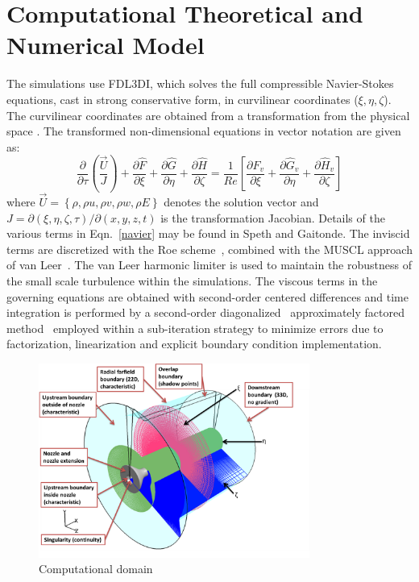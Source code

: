 \documentclass[english]{aiaa-tc}
\begin{document}
\section{Computational Theoretical and Numerical Model}\label{theo}
The simulations use FDL3DI, which solves the full compressible Navier-Stokes equations, cast in strong conservative form, in curvilinear coordinates ($\xi,\eta,\zeta$). The curvilinear coordinates are obtained from a transformation from the physical space \cite{vm74-1,sjl78-1}. The transformed non-dimensional equations in vector notation are given as:
\begin{equation}
\frac{\partial}{\partial\tau}\left(\frac{\vec{U}}{J}\right)+\frac{\partial\hat{F}}{\partial\xi}+\frac{\partial\hat{G}}{\partial\eta}+\frac{\partial\hat{H}}{\partial\zeta}=\frac{1}{Re}\left[\frac{\partial\hat{F}_{v}}{\partial\xi}+\frac{\partial\hat{G}_{v}}{\partial\eta}+\frac{\partial\hat{H}_{v}}{\partial\zeta}\right]\label{navier}
\end{equation}
where $\vec{U}=\left\{ \rho,\rho u,\rho v,\rho w,\rho E\right\} $
denotes the solution vector and
$J=\partial\left(\xi,\eta,\zeta,\tau\right)/\partial\left(x,y,z,t\right)$
is the transformation Jacobian.  Details of the various terms in
Eqn.~\ref{navier} may be found in Speth and 
Gaitonde\cite{speth2012b}.
The inviscid terms are discretized
with the Roe scheme~\cite{rpl81-1}, combined with the MUSCL approach
of van Leer~\cite{lbv79-1}. The van Leer harmonic limiter\cite{lbv79-1} is used to maintain the robustness of the small scale turbulence within the simulations. The viscous
terms in the governing 
equations are obtained with second-order centered differences and time integration is performed by a second-order diagonalized~\cite{pth81-1} approximately
factored method~\cite{br78-1} employed within a sub-iteration
strategy to minimize errors due to factorization, linearization and
explicit boundary condition implementation.

\begin{figure}
\begin{center}
	\includegraphics[width=3.5in]{MACH09ComputationalDomain1.png}
\caption{Computational domain}\label{fig:M09Computationaldomain}
\end{center}
 \end{figure}
\end{document}
